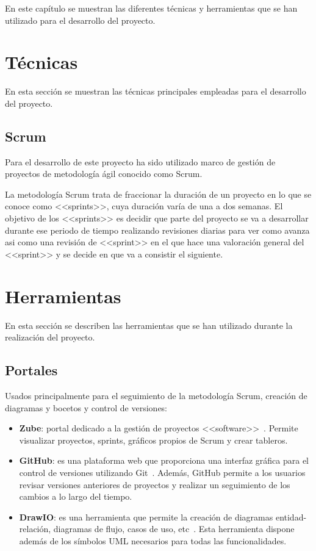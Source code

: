 
En este capítulo se muestran las diferentes técnicas y herramientas que se han utilizado para el desarrollo del proyecto.


\section{Técnicas}

En esta sección se muestran las técnicas principales empleadas para el desarrollo del proyecto.

\subsection{Scrum}

Para el desarrollo de este proyecto ha sido utilizado marco de gestión de proyectos de metodología ágil conocido como Scrum.

La metodología Scrum trata de fraccionar la duración de un proyecto en lo que se conoce como <<sprints>>, cuya duración varía de una a dos semanas.
El objetivo de los <<sprints>> es decidir que parte del proyecto se va a desarrollar durante ese periodo de tiempo realizando revisiones diarias para ver como avanza asi como una revisión de <<sprint>> en el que hace una valoración general del <<sprint>> y se decide en que va a consistir el siguiente.

\section{Herramientas}
\label{chap:Tyh}
En esta sección se describen las herramientas que se han utilizado durante la realización del proyecto.

\subsection{Portales}

Usados principalmente para el seguimiento de la metodología Scrum, creación de diagramas y bocetos y control de versiones:
\begin{itemize}
\item \textbf{Zube}: portal dedicado a la gestión de proyectos <<software>>~\cite{zubeHome}. Permite visualizar proyectos, sprints,
gráficos propios de Scrum y crear tableros.
\item \textbf{GitHub}: es una plataforma web que proporciona una interfaz gráfica para el control de versiones utilizando Git~\cite{githubHome}. Además, GitHub permite a los usuarios revisar versiones anteriores de proyectos y realizar un seguimiento de los cambios a lo largo del tiempo.
\item \textbf{DrawIO}: es una herramienta que permite la creación de diagramas entidad-relación, diagramas de flujo, casos de uso, etc~\cite{drawioHome}. Esta herramienta dispone además de los símbolos UML necesarios para todas las funcionalidades.
\end{itemize}

